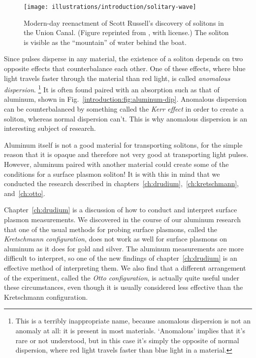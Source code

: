 \begin{figure}[tb]
  \centering
  \texttt{[image: illustrations/introduction/solitary-wave]}
  \caption{Modern-day reenactment of Scott Russell's discovery of solitons in the Union Canal.
(Figure reprinted from \textcite{Soliton1995}, with license.) The soliton is visible as the ``mountain'' of water behind the boat.}
  \label{introduction:fig:solitary-wave}
\end{figure}

Since pulses disperse in any material, the existence of a soliton depends on two opposite effects that counterbalance each other.
One of these effects, where blue light travels faster through the material than red light, is called \emph{anomalous dispersion}.%
\footnote{This is a terribly inappropriate name, because anomalous dispersion is not an anomaly at all: it is present in most materials.
`Anomalous' implies that it's rare or not understood, but in this case it's simply the opposite of normal dispersion, where red light travels faster than blue light in a material.} It is often found paired with an absorption such as that of aluminum, shown in Fig.~\ref{introduction:fig:aluminum-dip}.
Anomalous dispersion can be counterbalanced by something called the \emph{Kerr effect} in order to create a soliton, whereas normal dispersion can't.
This is why anomalous dispersion is an interesting subject of research.

Aluminum itself is not a good material for transporting solitons, for the simple reason that it is opaque and therefore not very good at transporting light pulses.
However, aluminum paired with another material could create some of the conditions for a surface plasmon soliton! It is with this in mind that we conducted the research described in chapters~\ref{ch:drudium},~\ref{ch:kretschmann}, and~\ref{ch:otto}.

Chapter~\ref{ch:drudium} is a discussion of how to conduct and interpret surface plasmon measurements.
We discovered in the course of our aluminum research that one of the usual methods for probing surface plasmons, called the \emph{Kretschmann configuration}, does not work as well for surface plasmons on aluminum as it does for gold and silver.
The aluminum measurements are more difficult to interpret, so one of the new findings of chapter~\ref{ch:drudium} is an effective method of interpreting them.
We also find that a different arrangement of the experiment, called the \emph{Otto configuration}, is actually quite useful under these circumstances, even though it is usually considered less effective than the Kretschmann configuration.

